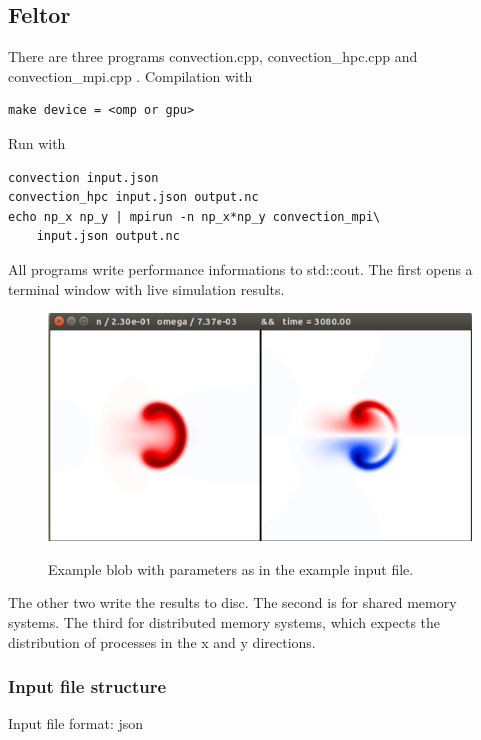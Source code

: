 \documentclass{hitec} %
\begin{document}
\subsection{Feltor}
There are three programs convection.cpp, convection\_hpc.cpp and convection\_mpi.cpp . Compilation with
\begin{verbatim}
make device = <omp or gpu>
\end{verbatim}
Run with
\begin{verbatim}
convection input.json
convection_hpc input.json output.nc
echo np_x np_y | mpirun -n np_x*np_y convection_mpi\
    input.json output.nc
\end{verbatim}
All programs write performance informations to std::cout.
The first opens a terminal window with live simulation results.
\begin{figure}[htpb]
\centering
\includegraphics[trim = 0px 0px 0px 0px, clip, scale=0.4]{./blob}\label{fig:example}
\caption{
  Example blob with parameters as in the example input file.
}
\end{figure}
The other two write the results to disc.
The second is for shared memory systems. The third for distributed
memory systems, which expects the distribution of processes in the
x and y directions.

\subsubsection{Input file structure}
Input file format: json
\end{document}
